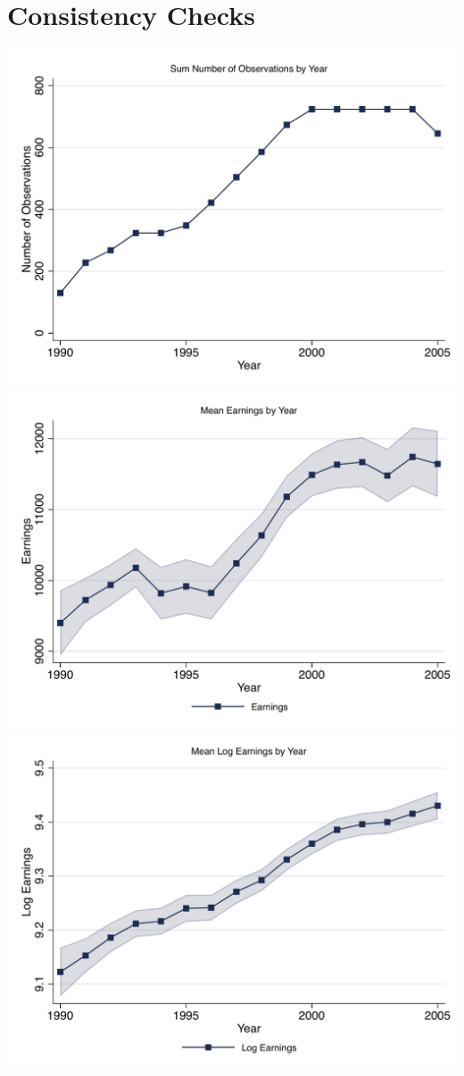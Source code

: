 \documentclass{article}
\begin{document}
\section{Consistency Checks}
\includegraphics[width = .9\textwidth]{Consistency/counts_by_time.pdf} \\ 
\includegraphics[width = .9\textwidth]{Consistency/earn_by_time.pdf} \\ 
\includegraphics[width = .9\textwidth]{Consistency/logearn_by_time.pdf} \\ 
\end{document}

